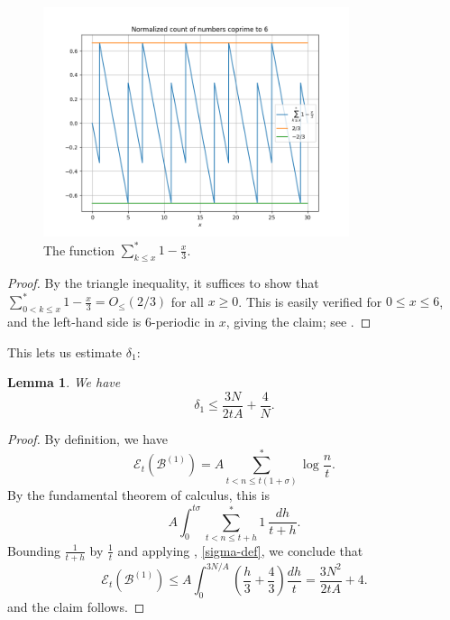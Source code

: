 \documentclass[12pt,a4paper,reqno]{amsart}
\numberwithin{equation}{section}
\theoremstyle{plain}
\newtheorem{lemma}[theorem]{Lemma}
\theoremstyle{definition}
\newcommand\tuple{{\mathcal B}}
\newcommand\excess{{\mathcal{E}}}
\begin{document}
\begin{figure}
  \centering
  \includegraphics[width=0.8\textwidth]{sawtooth.png}
  \caption{The function $\sum_{k \leq x}^* 1 - \frac{x}{3}$.}\label{fig-saw}
\end{figure}

\begin{proof}  By the triangle inequality, it suffices to show that $\sum_{0 < k \leq x}^* 1 - \frac{x}{3} = O_{\leq}(2/3)$ for all $x \geq 0$.  This is easily verified for $0 \leq x \leq 6$, and the left-hand side is $6$-periodic in $x$, giving the claim; see .
\end{proof}

This lets us estimate $\delta_1$:

\begin{lemma}\label{delta1-bound} We have
$$ \delta_1 \leq \frac{3N}{2tA} + \frac{4}{N}.$$
\end{lemma}

\begin{proof}  By definition, we have
$$ \excess_t(\tuple^{(1)}) = A \sum^*_{t < n \leq t(1+\sigma)} \log \frac{n}{t}.$$
By the fundamental theorem of calculus, this is
$$ A \int_0^{t\sigma} \sum^*_{t < n \leq t+h} 1\ \frac{dh}{t+h}.$$
Bounding $\frac{1}{t+h}$ by $\frac{1}{t}$ and applying , \eqref{sigma-def}, we conclude that
$$
 \excess_t(\tuple^{(1)}) \leq A \int_0^{3N/A} \left(\frac{h}{3} + \frac{4}{3}\right) \frac{dh}{t} = \frac{3N^2}{2tA} + 4.
$$
and the claim follows.
\end{proof}
\end{document}
